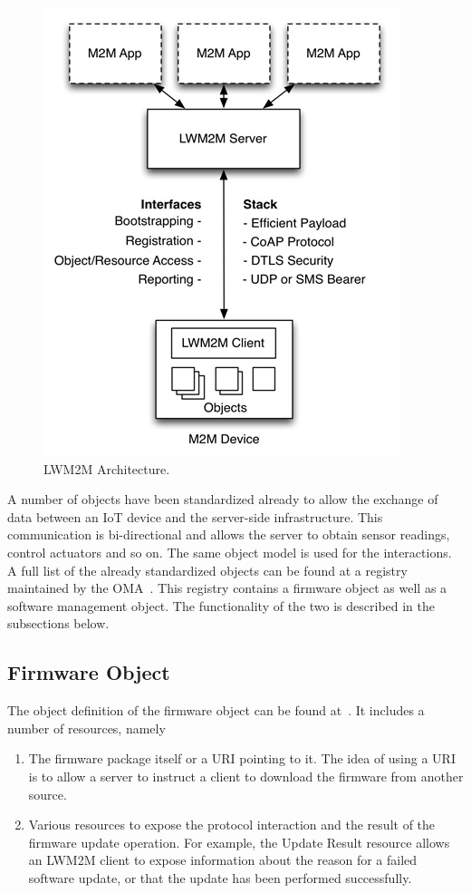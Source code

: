 \documentclass[peerreview, a4paper, 7pt]{IEEEtran}
\begin{document}
\begin{figure}[!htbp]
 \centering
 \includegraphics[scale=0.50]{lwm2m-architecture.jpg}
 \caption{LWM2M Architecture.}
 \label{lwm2m-architecture-figure}
\end{figure}

A number of objects have been standardized already to allow the exchange of data between an IoT device and the server-side infrastructure. This communication is bi-directional and allows the server to obtain sensor readings, control actuators and so on. The same object model is used for the interactions. A full list of the already standardized objects can be found at a registry maintained by the OMA~\cite{OMNA}. This registry contains a firmware object as well as a software management object. The functionality of the two is described in the subsections below.

\subsection{Firmware Object} 
The object definition of the firmware object can be found at~\cite{firmware-object}. It includes a number of resources, namely 
\begin{enumerate}
\item The firmware package itself or a URI pointing to it. The idea of using a URI is to allow a server to instruct a client to download the firmware from another source. 
\item Various resources to expose the protocol interaction and the result of the firmware update operation. For example, the Update Result resource allows an LWM2M client to expose information about the reason for a failed software update, or that the update has been performed successfully. 
\end{enumerate}
\end{document}
